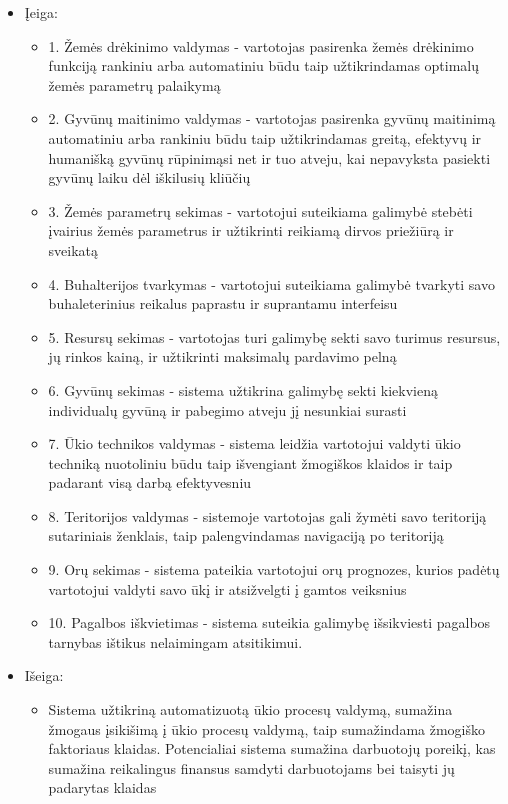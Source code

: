 \documentclass[oneside]{VUMIFPSkursinis}
\begin{document}
	\begin{itemize}
		\item{Įeiga: }
		\begin{itemize}
			\item{1. Žemės drėkinimo valdymas - vartotojas pasirenka žemės drėkinimo funkciją rankiniu arba automatiniu būdu taip užtikrindamas optimalų žemės parametrų palaikymą}
			\item{2. Gyvūnų maitinimo valdymas - vartotojas pasirenka gyvūnų maitinimą automatiniu arba rankiniu būdu taip užtikrindamas greitą, efektyvų ir humanišką gyvūnų rūpinimąsi net ir tuo atveju, kai nepavyksta pasiekti gyvūnų laiku dėl iškilusių kliūčių}
			\item{3. Žemės parametrų sekimas - vartotojui suteikiama galimybė stebėti įvairius žemės parametrus ir užtikrinti reikiamą dirvos priežiūrą ir sveikatą}
			\item{4. Buhalterijos tvarkymas - vartotojui suteikiama galimybė tvarkyti savo buhaleterinius reikalus paprastu ir suprantamu interfeisu}
			\item{5. Resursų sekimas - vartotojas turi galimybę sekti savo turimus resursus, jų rinkos kainą, ir užtikrinti maksimalų pardavimo pelną}
			\item{6. Gyvūnų sekimas - sistema užtikrina galimybę sekti kiekvieną individualų gyvūną ir pabegimo atveju jį nesunkiai surasti}
			\item{7. Ūkio technikos valdymas - sistema leidžia vartotojui valdyti ūkio techniką nuotoliniu būdu taip išvengiant žmogiškos klaidos ir taip padarant visą darbą efektyvesniu}
			\item{8. Teritorijos valdymas - sistemoje vartotojas gali žymėti savo teritoriją sutariniais ženklais, taip palengvindamas navigaciją po teritoriją}
			\item{9. Orų sekimas - sistema pateikia vartotojui orų prognozes, kurios padėtų vartotojui valdyti savo ūkį ir atsižvelgti į gamtos veiksnius}
			\item{10. Pagalbos iškvietimas - sistema suteikia galimybę išsikviesti pagalbos tarnybas ištikus nelaimingam atsitikimui.}
		\end{itemize}
		\item{Išeiga:}
		\begin{itemize}
			\item{Sistema užtikriną automatizuotą ūkio procesų valdymą, sumažina žmogaus įsikišimą į ūkio procesų valdymą, taip sumažindama žmogiško faktoriaus klaidas. Potencialiai sistema sumažina darbuotojų poreikį, kas sumažina reikalingus finansus samdyti darbuotojams bei taisyti jų padarytas klaidas}

\end{itemize}
\end{itemize}
\end{document}
